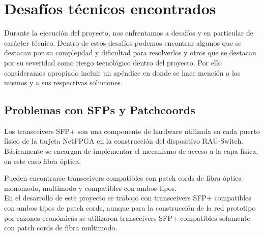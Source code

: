 
\chapter{Desaf\'ios t\'ecnicos encontrados}

\ifpdf
    \graphicspath{{Appendix2/Figs/Raster/}{Appendix2/Figs/PDF/}{Appendix2/Figs/}}
\else
    \graphicspath{{Appendix2/Figs/Vector/}{Appendix2/Figs/}}
\fi

Durante la ejecuci\'on del proyecto, nos enfrentamos a desaf\'ios y en particular de carácter t\'ecnico. Dentro de estos desaf\'ios podemos encontrar algunos que se destacan por su complejidad y dificultad para resolverlos y otros que se destacan por su severidad como riesgo tecnol\'ogico dentro del proyecto. Por ello consideramos apropiado incluir un ap\'endice en donde se hace menci\'on a los mismos y a sus respectivas soluciones.

\section{Problemas con SFPs y Patchcoords}

Los transceivers SFP+ son una componente de hardware utilizada en cada puerto f\'isico de la tarjeta NetFPGA en la construcci\'on del dispositivo RAU-Switch. Básicamente se encargan de implementar el mecanismo de acceso a la capa f\'isica, en este caso fibra \'optica.

Pueden encontrarse transceivers compatibles con patch cords de fibra \'optica monomodo, multimodo y compatibles con ambos tipos.\\

En el desarrollo de este proyecto se trabajo con transceivers SFP+ compatibles con ambos tipos de patch cords, aunque para la construcci\'on de la red prototipo por razones econ\'omicas se utilizaron transceivers SFP+ compatibles solamente con patch cords de fibra multimodo.




